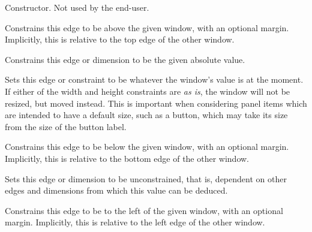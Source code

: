 

Constructor. Not used by the end-user.



Constrains this edge to be above the given window, with an
optional margin. Implicitly, this is relative to the top edge of the other window.



Constrains this edge or dimension to be the given absolute value.



Sets this edge or constraint to be whatever the window's value is
at the moment. If either of the width and height constraints
are {\it as is}, the window will not be resized, but moved instead.
This is important when considering panel items which are intended
to have a default size, such as a button, which may take its size
from the size of the button label.



Constrains this edge to be below the given window, with an
optional margin. Implicitly, this is relative to the bottom edge of the other window.



Sets this edge or dimension to be unconstrained, that is, dependent on
other edges and dimensions from which this value can be deduced.



Constrains this edge to be to the left of the given window, with an
optional margin. Implicitly, this is relative to the left edge of the other window.

